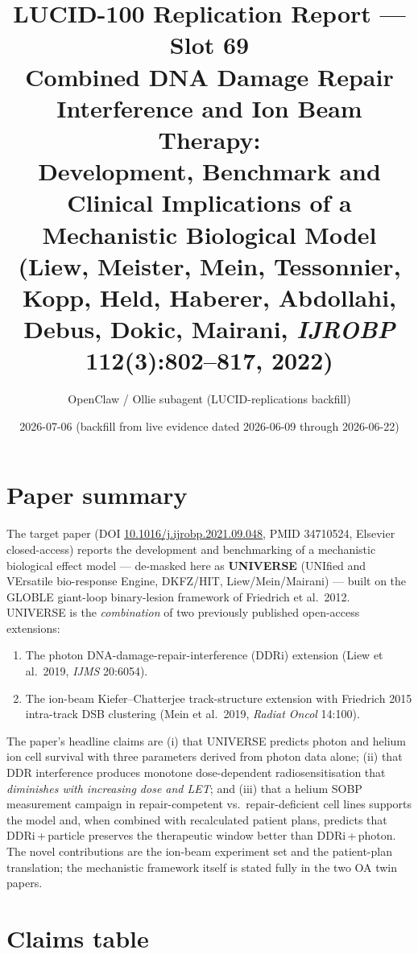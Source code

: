 \documentclass[11pt]{article}
\title{LUCID-100 Replication Report --- Slot 69\\
\large Combined DNA Damage Repair Interference and Ion Beam Therapy:\\
Development, Benchmark and Clinical Implications of a Mechanistic Biological Model\\
(Liew, Meister, Mein, Tessonnier, Kopp, Held, Haberer, Abdollahi, Debus, Dokic, Mairani, \emph{IJROBP} 112(3):802--817, 2022)}
\author{OpenClaw / Ollie subagent (LUCID-replications backfill)}
\date{2026-07-06 (backfill from live evidence dated 2026-06-09 through 2026-06-22)}
\begin{document}
\maketitle

\section{Paper summary}

The target paper (DOI \href{https://doi.org/10.1016/j.ijrobp.2021.09.048}{10.1016/j.ijrobp.2021.09.048},
PMID 34710524, Elsevier closed-access) reports the development and benchmarking of a mechanistic
biological effect model --- de-masked here as \textbf{UNIVERSE} (UNIfied and VErsatile bio-response
Engine, DKFZ/HIT, Liew/Mein/Mairani) --- built on the GLOBLE giant-loop binary-lesion framework of
Friedrich et al.\ 2012. UNIVERSE is the \emph{combination} of two previously published open-access
extensions:
\begin{enumerate}[nosep]
  \item The photon DNA-damage-repair-interference (DDRi) extension (Liew et al.\ 2019, \emph{IJMS} 20:6054).
  \item The ion-beam Kiefer--Chatterjee track-structure extension with Friedrich 2015 intra-track DSB
        clustering (Mein et al.\ 2019, \emph{Radiat Oncol} 14:100).
\end{enumerate}
The paper's headline claims are (i) that UNIVERSE predicts photon and helium ion cell survival with
three parameters derived from photon data alone; (ii) that DDR interference produces monotone
dose-dependent radiosensitisation that \emph{diminishes with increasing dose and LET}; and (iii)
that a helium SOBP measurement campaign in repair-competent vs.\ repair-deficient cell lines
supports the model and, when combined with recalculated patient plans, predicts that
DDRi\,+\,particle preserves the therapeutic window better than DDRi\,+\,photon. The novel
contributions are the ion-beam experiment set and the patient-plan translation; the mechanistic
framework itself is stated fully in the two OA twin papers.

\section{Claims table}
\end{document}
